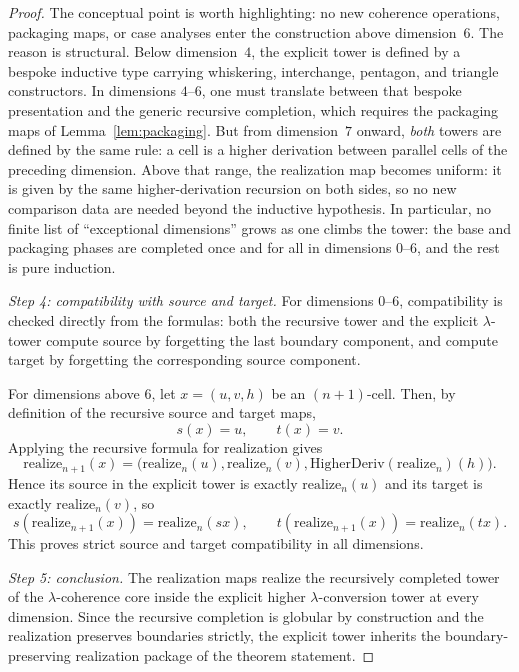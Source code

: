 \documentclass[webpdf,traditional,large,numbered]{oup-authoring-template}
\theoremstyle{thmstyleone}%
\theoremstyle{thmstyletwo}%
\theoremstyle{thmstylethree}%
\newcommand{\HigherDeriv}{\mathrm{HigherDeriv}}
\newcommand{\realize}{\mathrm{realize}}
\begin{document}
\begin{proof}
The conceptual point is worth highlighting: no new coherence operations,
packaging maps, or case analyses enter the construction above dimension~$6$.
The reason is structural.  Below dimension~$4$, the explicit tower is defined by
a bespoke inductive type carrying whiskering, interchange, pentagon, and
triangle constructors.  In dimensions $4$--$6$, one must translate between that
  bespoke presentation and the generic recursive completion, which requires the
  packaging maps of Lemma~\ref{lem:packaging}.  But from dimension~$7$ onward,
  \emph{both} towers are defined by the same rule: a cell is a higher derivation
  between parallel cells of the preceding dimension.  Above that range, the
  realization map becomes uniform: it is given by the same
  higher-derivation recursion on both sides, so no new comparison data are
  needed beyond the inductive hypothesis.  In
  particular, no finite list of ``exceptional dimensions'' grows as one climbs the
  tower: the base and packaging phases are completed once and for all in
  dimensions $0$--$6$, and the rest is pure induction.

\smallskip
\noindent
\emph{Step 4: compatibility with source and target.}
For dimensions $0$--$6$, compatibility is checked directly from the formulas:
both the recursive tower and the explicit $\lambda$-tower compute source by
forgetting the last boundary component, and compute target by forgetting the
corresponding source component.

For dimensions above $6$, let $x=(u,v,h)$ be an $(n+1)$-cell.  Then, by
definition of the recursive source and target maps,
\[
s(x)=u,\qquad t(x)=v.
\]
Applying the recursive formula for realization gives
\[
\realize_{n+1}(x)=
\bigl(\realize_n(u),\realize_n(v),\HigherDeriv(\realize_n)(h)\bigr).
\]
Hence its source in the explicit tower is exactly $\realize_n(u)$ and its target
is exactly $\realize_n(v)$, so
\[
s(\realize_{n+1}(x))=\realize_n(sx),\qquad
t(\realize_{n+1}(x))=\realize_n(tx).
\]
This proves strict source and target compatibility in all dimensions.

\smallskip
\noindent
\emph{Step 5: conclusion.}
The realization maps realize the recursively completed tower of the
$\lambda$-coherence core inside the explicit higher
$\lambda$-conversion tower at every dimension.  Since the recursive completion
is globular by construction and the realization preserves boundaries strictly,
the explicit tower inherits the boundary-preserving realization package of the
theorem statement.
\end{proof}
\end{document}
